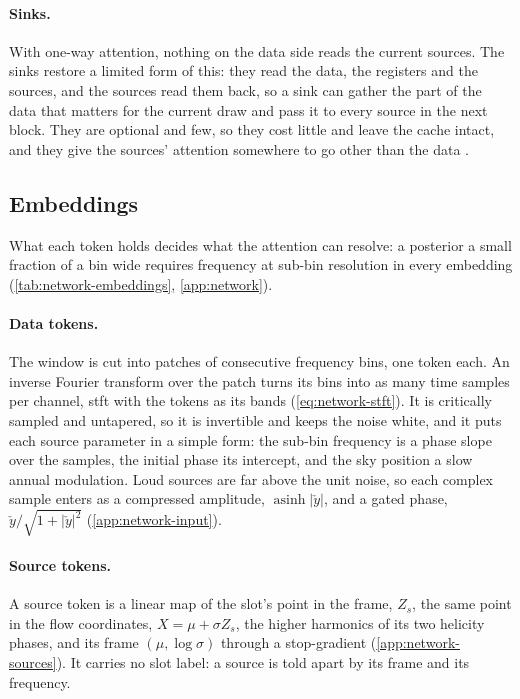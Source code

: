 \paragraph{Sinks.}
With one-way attention, nothing on the data side reads the current sources. The sinks restore a
limited form of this: they read the data, the registers and the sources, and the sources read them
back, so a sink can gather the part of the data that matters for the current draw and pass it to
every source in the next block. They are optional and few, so they cost little and leave the cache
intact, and they give the sources' attention somewhere to go other than the data
\citep{xiao2024efficient,darcet2024vision}.

\subsection{Embeddings}
\label{sec:method-embeddings}

What each token holds decides what the attention can resolve: a posterior a small fraction of a bin
wide requires frequency at sub-bin resolution in every embedding (\cref{tab:network-embeddings},
\cref{app:network}).

\paragraph{Data tokens.}
The window is cut into patches of \NetworkPatch{} consecutive frequency bins, one token each. An
inverse Fourier transform over the patch turns its bins into as many time samples per channel, 
\ac{stft} with the tokens as its bands (\cref{eq:network-stft}). It is critically sampled and
untapered, so it is invertible and keeps the noise white, and it puts each source parameter in a
simple form: the sub-bin frequency is a phase slope over the samples, the initial phase its
intercept, and the sky position a slow annual modulation. Loud sources are far above the unit
noise, so each complex sample enters as a compressed amplitude,
$\operatorname{asinh}\lvert\check y\rvert$, and a gated phase,
$\check y/\sqrt{1+\lvert\check y\rvert^2}$ (\cref{app:network-input}).

\paragraph{Source tokens.}
A source token is a linear map of the slot's point in the frame, $Z_s$, the same point in the flow
coordinates, $X=\mu+\sigma Z_s$, the higher harmonics of its two helicity phases, and its frame
$(\mu,\log\sigma)$ through a stop-gradient (\cref{app:network-sources}). It carries no slot label:
a source is told apart by its frame and its frequency.

